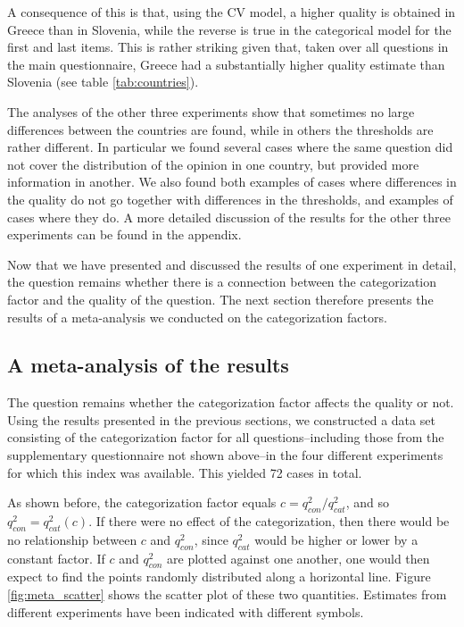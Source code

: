 \documentclass[a4paper,12pt]{article}
\begin{document}
A consequence of this is that, using the CV model, a higher quality is obtained in Greece than in Slovenia, while the reverse is true in the categorical model for the first and last items. This is rather striking given that, taken over all questions in the main questionnaire, Greece had a substantially higher quality estimate than Slovenia (see table \ref{tab:countries}).

The analyses of the other three experiments show that sometimes no large differences between the countries are found, while in others the thresholds are rather different. In particular we found several cases where the same question did not cover the distribution of the opinion in one country, but provided more information in another. We also found both examples of cases where differences in the quality do not go together with differences in the thresholds, and examples of cases where they do. A more detailed discussion of the results for the other three experiments can be found in the appendix.

Now that we have presented and discussed the results of one experiment in detail, the question remains whether there is a connection between the categorization factor and the quality of the question. The next section therefore presents the results of a meta-analysis we conducted on the categorization factors. 


\subsection{A meta-analysis of the results}

The question remains whether the categorization factor affects the quality or not.
Using the results presented in the previous sections, we constructed a data set consisting of the categorization factor for all questions--including those from the supplementary questionnaire not shown above--in the four different experiments for which this index was available. This yielded 72 cases in total. 

As shown before, the categorization factor equals $c = q^2_{con} / q^2_{cat}$, and so $q^2_{con} = q^2_{cat} (c)$. If there were no effect of the categorization, then there would be no relationship between $c$ and $q^2_{con}$, since $q^2_{cat}$ would be higher or lower by a constant factor. If  $c$ and $q^2_{con}$ are plotted against one another, one would then expect to find the points randomly distributed along a horizontal line. Figure \ref{fig:meta_scatter} shows the scatter plot of these two quantities. Estimates from different experiments have been indicated with different symbols.
\end{document}
